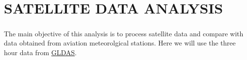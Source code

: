 \chapter{\normalsize{SATELLITE DATA ANALYSIS}}
\paragraph{}
The main objective of this analysis is to process satellite data and compare with data obtained from aviation meteorolgical stations. Here we will use the three hour data from  \href{https://ldas.gsfc.nasa.gov/gldas}{GLDAS}.
